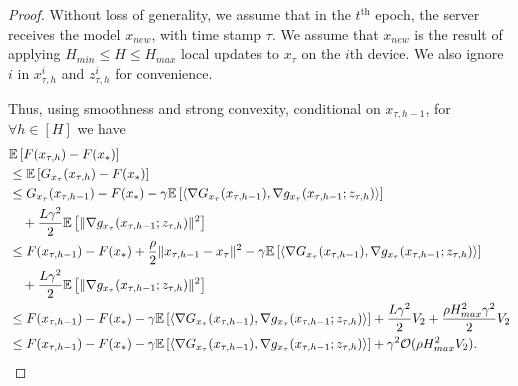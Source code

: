 \documentclass{opt2020} %
\begin{document}
\begin{proof}
Without loss of generality, we assume that in the $t^{\mbox{th}}$ epoch, the server receives the model $x_{new}$, with time stamp $\tau$. We assume that $x_{new}$ is the result of applying $H_{min} \leq H \leq H_{max}$ local updates to $x_{\tau}$ on the $i$th device. We also ignore $i$ in $x_{\tau, h}^i$ and $z_{\tau, h}^i$ for convenience.

Thus, using smoothness and strong convexity, conditional on $x_{\tau, h-1}$, for $\forall h \in [H]$ we have
\begin{align*}
&{\mathbb{E}}\left[ F(x_{\tau, h}) - F(x_*) \right] \\
&\leq {\mathbb{E}}\left[ G_{x_\tau}(x_{\tau, h}) - F(x_*) \right] \\
&\leq G_{x_\tau}(x_{\tau, h-1}) - F(x_*) - \gamma {\mathbb{E}}\left[  \left\langle \nabla G_{x_\tau}(x_{\tau, h-1}), \nabla g_{x_\tau}(x_{\tau, h-1}; z_{\tau, h}) \right \rangle \right] \\
&\quad + \frac{L \gamma^2}{2} {\mathbb{E}}\left[  \| \nabla g_{x_\tau}(x_{\tau, h-1}; z_{\tau, h}) \|^2 \right] \\
&\leq F(x_{\tau, h-1}) - F(x_*) + \frac{\rho}{2} \|x_{\tau, h-1} - x_{\tau}\|^2 - \gamma {\mathbb{E}}\left[  \left\langle \nabla G_{x_\tau}(x_{\tau, h-1}), \nabla g_{x_\tau}(x_{\tau, h-1}; z_{\tau, h}) \right \rangle \right] \\
&\quad + \frac{L \gamma^2}{2} {\mathbb{E}}\left[  \| \nabla g_{x_\tau}(x_{\tau, h-1}; z_{\tau, h}) \|^2 \right] \\
&\leq F(x_{\tau, h-1}) - F(x_*) - \gamma {\mathbb{E}}\left[  \left\langle \nabla G_{x_\tau}(x_{\tau, h-1}), \nabla g_{x_\tau}(x_{\tau, h-1}; z_{\tau, h}) \right \rangle \right] + \frac{L \gamma^2}{2} V_2 + \frac{\rho H_{max}^2 \gamma^2}{2} V_2 \\
&\leq F(x_{\tau, h-1}) - F(x_*) - \gamma {\mathbb{E}}\left[  \left\langle \nabla G_{x_\tau}(x_{\tau, h-1}), \nabla g_{x_\tau}(x_{\tau, h-1}; z_{\tau, h}) \right \rangle \right] + \gamma^2 {\mathcal O}(\rho H_{max}^2 V_2).
\end{align*}


\end{proof}
\end{document}
